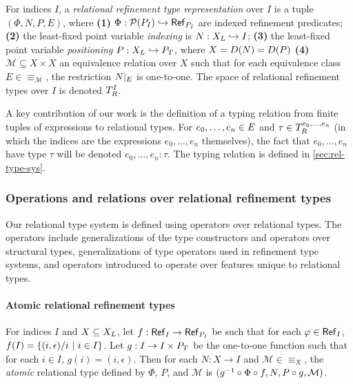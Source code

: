 For indices $I$, a \emph{relational refinement type representation}
over $I$ is a tuple $(\Phi, N, P, E)$, where
\textbf{(1)}
$\Phi : \mathcal{P}(P_{I}) \hookrightarrow \mathsf{Ref}_{ P_{I} }$ are indexed
refinement predicates;
%
\textbf{(2)} the least-fixed point variable \emph{indexing} is
$N : X_L \hookrightarrow I$;
%
\textbf{(3)} the least-fixed point variable \emph{positioning}
$P : X_L \hookrightarrow P_T$, where $X = D(N) = D(P)$
%
\textbf{(4)} $\mathcal{M} \subseteq X \times X$ an equivalence
relation over $X$ such that for each equivalence class
$E \in \equiv_{\mathcal{M}}$, the restriction $N|_{E}$ is
one-to-one.
%
The space of relational refinement types over $I$ is denoted
$T_{R}^{I}$.

A key contribution of our work is the definition of a typing relation
from finite tuples of expressions to relational types.
%
For $e_0, \ldots, e_n \in E$ and
$\tau \in T_{R}^{e_0, \ldots, e_n}$ (in which the indices are the
expressions $e_0, \ldots, e_n$ themselves), the fact that
$e_0, \ldots, e_n$ have type $\tau$ will be denoted
$e_0, \ldots, e_n : \tau$.
%
The typing relation is defined in \autoref{sec:rel-type-sys}.

\subsubsection{Operations and relations over relational refinement types}
\label{sec:rel-type-ops}
Our relational type system is defined using operators over relational
types.
%
The operators include generalizations of the type constructors and
operators over structural types, generalizations of type operators
used in refinement type systems, and operators introduced to operate
over features unique to relational types.

\paragraph{Atomic relational refinement types}
%
For indices $I$ and $X \subseteq X_L$, let
$f : \mathsf{Ref}_{I} \to \mathsf{Ref}_{P_{I} }$ be such that for each
$\varphi \in \mathsf{Ref}_{I}$,
$f(I) = \{  (i, \epsilon) / i \ |\  i \in I  \}$.
%
Let $g : I \to I \times P_T$ be the one-to-one function such that
for each $i \in I$, $g(i) = (i, \epsilon)$.
%
Then for each $N : X \to I$ and $\mathcal{M} \in \equiv_X$, the
\emph{atomic} relational type defined by $\Phi$, $P$, and
$\mathcal{M}$ is
$(g^{-1} \circ \Phi \circ f, N, P \circ g, \mathcal{M})$.

